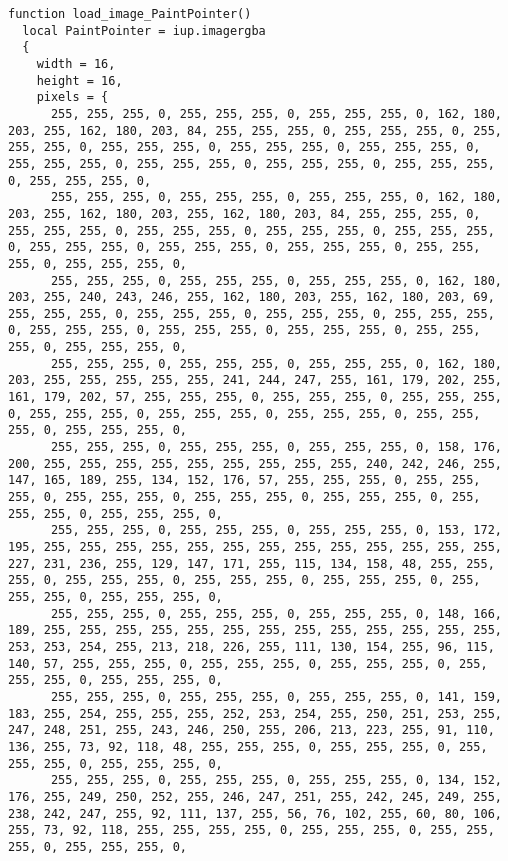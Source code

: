 \documentclass{ctexart}
\begin{document}
\begin{lstlisting}
function load_image_PaintPointer()
  local PaintPointer = iup.imagergba
  {
    width = 16,
    height = 16,
    pixels = {
      255, 255, 255, 0, 255, 255, 255, 0, 255, 255, 255, 0, 162, 180, 203, 255, 162, 180, 203, 84, 255, 255, 255, 0, 255, 255, 255, 0, 255, 255, 255, 0, 255, 255, 255, 0, 255, 255, 255, 0, 255, 255, 255, 0, 255, 255, 255, 0, 255, 255, 255, 0, 255, 255, 255, 0, 255, 255, 255, 0, 255, 255, 255, 0, 
      255, 255, 255, 0, 255, 255, 255, 0, 255, 255, 255, 0, 162, 180, 203, 255, 162, 180, 203, 255, 162, 180, 203, 84, 255, 255, 255, 0, 255, 255, 255, 0, 255, 255, 255, 0, 255, 255, 255, 0, 255, 255, 255, 0, 255, 255, 255, 0, 255, 255, 255, 0, 255, 255, 255, 0, 255, 255, 255, 0, 255, 255, 255, 0, 
      255, 255, 255, 0, 255, 255, 255, 0, 255, 255, 255, 0, 162, 180, 203, 255, 240, 243, 246, 255, 162, 180, 203, 255, 162, 180, 203, 69, 255, 255, 255, 0, 255, 255, 255, 0, 255, 255, 255, 0, 255, 255, 255, 0, 255, 255, 255, 0, 255, 255, 255, 0, 255, 255, 255, 0, 255, 255, 255, 0, 255, 255, 255, 0, 
      255, 255, 255, 0, 255, 255, 255, 0, 255, 255, 255, 0, 162, 180, 203, 255, 255, 255, 255, 255, 241, 244, 247, 255, 161, 179, 202, 255, 161, 179, 202, 57, 255, 255, 255, 0, 255, 255, 255, 0, 255, 255, 255, 0, 255, 255, 255, 0, 255, 255, 255, 0, 255, 255, 255, 0, 255, 255, 255, 0, 255, 255, 255, 0, 
      255, 255, 255, 0, 255, 255, 255, 0, 255, 255, 255, 0, 158, 176, 200, 255, 255, 255, 255, 255, 255, 255, 255, 255, 240, 242, 246, 255, 147, 165, 189, 255, 134, 152, 176, 57, 255, 255, 255, 0, 255, 255, 255, 0, 255, 255, 255, 0, 255, 255, 255, 0, 255, 255, 255, 0, 255, 255, 255, 0, 255, 255, 255, 0, 
      255, 255, 255, 0, 255, 255, 255, 0, 255, 255, 255, 0, 153, 172, 195, 255, 255, 255, 255, 255, 255, 255, 255, 255, 255, 255, 255, 255, 227, 231, 236, 255, 129, 147, 171, 255, 115, 134, 158, 48, 255, 255, 255, 0, 255, 255, 255, 0, 255, 255, 255, 0, 255, 255, 255, 0, 255, 255, 255, 0, 255, 255, 255, 0, 
      255, 255, 255, 0, 255, 255, 255, 0, 255, 255, 255, 0, 148, 166, 189, 255, 255, 255, 255, 255, 255, 255, 255, 255, 255, 255, 255, 255, 253, 253, 254, 255, 213, 218, 226, 255, 111, 130, 154, 255, 96, 115, 140, 57, 255, 255, 255, 0, 255, 255, 255, 0, 255, 255, 255, 0, 255, 255, 255, 0, 255, 255, 255, 0, 
      255, 255, 255, 0, 255, 255, 255, 0, 255, 255, 255, 0, 141, 159, 183, 255, 254, 255, 255, 255, 252, 253, 254, 255, 250, 251, 253, 255, 247, 248, 251, 255, 243, 246, 250, 255, 206, 213, 223, 255, 91, 110, 136, 255, 73, 92, 118, 48, 255, 255, 255, 0, 255, 255, 255, 0, 255, 255, 255, 0, 255, 255, 255, 0, 
      255, 255, 255, 0, 255, 255, 255, 0, 255, 255, 255, 0, 134, 152, 176, 255, 249, 250, 252, 255, 246, 247, 251, 255, 242, 245, 249, 255, 238, 242, 247, 255, 92, 111, 137, 255, 56, 76, 102, 255, 60, 80, 106, 255, 73, 92, 118, 255, 255, 255, 255, 0, 255, 255, 255, 0, 255, 255, 255, 0, 255, 255, 255, 0, 

\end{lstlisting}
\end{document}
